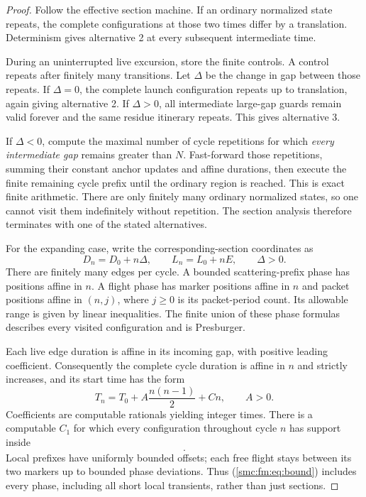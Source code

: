 \documentclass[11pt,letterpaper]{article}
\numberwithin{equation}{section}
\theoremstyle{definition}
\theoremstyle{remark}
\begin{document}
\begin{proof}
Follow the effective section machine. If an ordinary normalized state repeats,
the complete configurations at those two times differ by a translation.
Determinism gives alternative 2 at every subsequent intermediate time.

During an uninterrupted live excursion, store the finite controls. A control
repeats after finitely many transitions. Let $\Delta$ be the change in gap
between those repeats. If $\Delta=0$, the complete launch configuration repeats
up to translation, again giving alternative 2. If $\Delta>0$, all intermediate
large-gap guards remain valid forever and the same residue itinerary repeats.
This gives alternative 3.

If $\Delta<0$, compute the maximal number of cycle repetitions for which
\emph{every intermediate gap} remains greater than $N$. Fast-forward those
repetitions, summing their constant anchor updates and affine durations, then
execute the finite remaining cycle prefix until the ordinary region is reached.
This is exact finite arithmetic. There are only finitely many ordinary
normalized states, so one cannot visit them indefinitely without repetition.
The section analysis therefore terminates with one of the stated alternatives.

For the expanding case, write the corresponding-section coordinates as
\begin{equation}
 D_n=D_0+n\Delta,\qquad L_n=L_0+nE,\qquad \Delta>0. \label{smc:fm:eq:spatial}
\end{equation}
There are finitely many edges per cycle. A bounded scattering-prefix phase has
positions affine in $n$. A flight phase has marker positions affine in $n$ and
packet positions affine in $(n,j)$, where $j\ge0$ is its packet-period count.
Its allowable range is given by linear inequalities. The finite union of these
phase formulas describes every visited configuration and is Presburger.

Each live edge duration is affine in its incoming gap, with positive leading
coefficient. Consequently the complete cycle duration is affine in $n$ and
strictly increases, and its start time has the form
\begin{equation}
 T_n=T_0+A\frac{n(n-1)}2+C n,\qquad A>0.       \label{smc:fm:eq:time}
\end{equation}
Coefficients are computable rationals yielding integer times. There is a
computable $C_1$ for which every configuration throughout cycle $n$ has support
inside
\begin{equation}
 [L_0+nE-C_1,\quad L_0+nE+D_0+n\Delta+C_1].   \label{smc:fm:eq:bound}
\end{equation}
Local prefixes have uniformly bounded offsets; each free flight stays between
its two markers up to bounded phase deviations. Thus (\ref{smc:fm:eq:bound}) includes
every phase, including all short local transients, rather than just sections.
\end{proof}
\end{document}
